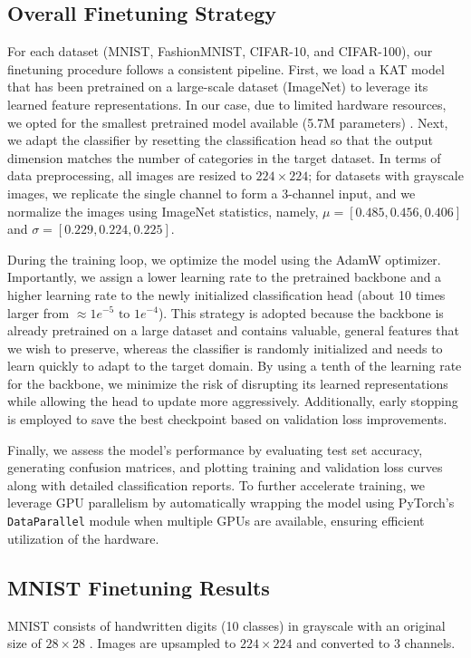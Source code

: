 \documentclass[conference]{IEEEtran}
\begin{document}
\subsection{Overall Finetuning Strategy}

For each dataset (MNIST, FashionMNIST, CIFAR-10, and CIFAR-100), our finetuning
procedure follows a consistent pipeline. First, we load a KAT model that has
been pretrained on a large-scale dataset (ImageNet) to leverage its learned
feature representations. In our case, due to limited hardware resources, we
opted for the smallest pretrained model available (5.7M parameters) \cite{kat}.
Next, we adapt the classifier by resetting the classification head so that the
output dimension matches the number of categories in the target dataset. In
terms of data preprocessing, all images are resized to $224\times224$; for
datasets with grayscale images, we replicate the single channel to form a
3-channel input, and we normalize the images using ImageNet statistics, namely,
\(\mu=[0.485, 0.456, 0.406]\) and \(\sigma=[0.229, 0.224, 0.225]\).

During the training loop, we optimize the model using the AdamW optimizer.
Importantly, we assign a lower learning rate to the pretrained backbone and a
higher learning rate to the newly initialized classification head (about 10
times larger from $\approx 1e^{-5} \text{ to } 1e^{-4}$). This strategy is
adopted because the backbone is already pretrained on a large dataset and
contains valuable, general features that we wish to preserve, whereas the
classifier is randomly initialized and needs to learn quickly to adapt to the
target domain. By using a tenth of the learning rate for the backbone, we
minimize the risk of disrupting its learned representations while allowing the
head to update more aggressively. Additionally, early stopping is employed to
save the best checkpoint based on validation loss improvements.

Finally, we assess the model's performance by evaluating test set accuracy,
generating confusion matrices, and plotting training and validation loss curves
along with detailed classification reports. To further accelerate training, we
leverage GPU parallelism by automatically wrapping the model using PyTorch's
\texttt{DataParallel} module when multiple GPUs are available, ensuring
efficient utilization of the hardware.

\subsection{MNIST Finetuning Results}
MNIST consists of handwritten digits (10 classes) in grayscale with an original
size of $28\times28$ \cite{mnist}. Images are upsampled to $224\times224$ and
converted to 3 channels.
\end{document}
